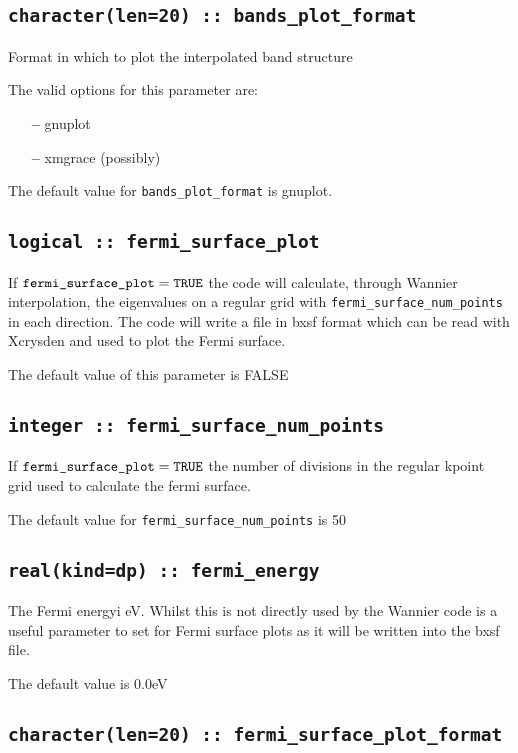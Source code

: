\subsection[bands\_plot\_format]{\tt character(len=20) :: bands\_plot\_format}

Format in which to plot the interpolated band structure

The valid options for this parameter are:
\begin{itemize}
\item[{\bf --}] gnuplot
\item[{\bf --}] xmgrace (possibly)
\end{itemize}

The default value for \verb#bands_plot_format# is gnuplot.


\subsection[fermi\_surface\_plot]{\tt logical :: fermi\_surface\_plot}

If $\verb#fermi_surface_plot#=\verb#TRUE#$ the code will calculate,
through Wannier interpolation, the
eigenvalues on a regular grid with \verb#fermi_surface_num_points# in
each direction. The code will write a file in bxsf format which can be
read with Xcrysden and used to plot the Fermi surface.

The default value of this parameter is FALSE


\subsection[fermi\_surface\_num\_points]{\tt integer :: fermi\_surface\_num\_points}

If $\verb#fermi_surface_plot#=\verb#TRUE#$ the number of divisions in
the regular kpoint grid used to calculate the fermi surface.

The default value for \verb#fermi_surface_num_points# is 50


\subsection[fermi\_energy]{\tt real(kind=dp) :: fermi\_energy}
The Fermi energyi eV. Whilst this is not directly used by the Wannier 
code is a useful parameter to set for Fermi surface plots as
it will be written into the bxsf file.

The default value is 0.0eV


\subsection[fermi\_surface\_plot\_format]{\tt character(len=20) :: fermi\_surface\_plot\_format}

